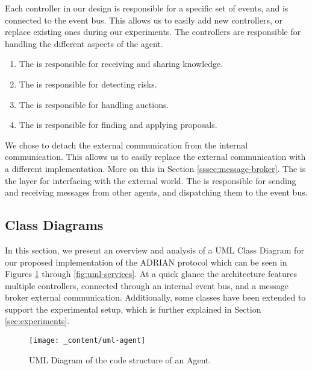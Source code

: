 Each controller in our design is responsible for a specific set of events, and is connected to the event bus. This allows us to easily add new controllers, or replace existing ones during our experiments. The controllers are responsible for handling the different aspects of the agent. 

\begin{enumerate}
    \item The  is responsible for receiving and sharing knowledge. 
    \item The  is responsible for detecting risks.
    \item The  is responsible for handling auctions. 
    \item The  is responsible for finding and applying proposals.
\end{enumerate}

We chose to detach the external communication from the internal communication. This allows us to easily replace the external communication with a different implementation. More on this in Section \ref{sssec:message-broker}.
The  is the layer for interfacing with the external world. The  is responsible for sending and receiving messages from other agents, and dispatching them to the event bus.

\subsection{Class Diagrams}
\label{ssec:class-diagrams}

In this section, we present an overview and analysis of a UML Class Diagram for our proposed implementation of the ADRIAN protocol \cite{mann2023ADRIAN} which can be seen in Figures \ref{fig:uml-agent} through \ref{fig:uml-services}. At a quick glance the architecture features multiple controllers, connected through an internal event bus, and a message broker external communication. Additionally, some classes have been extended to support the experimental setup, which is further explained in Section \ref{sec:experiments}.

\begin{figure}[H]
    \centering
    \texttt{[image: \_content/uml-agent]}
    \caption{UML Diagram of the code structure of an Agent.}
    \label{fig:uml-agent}
\end{figure}

